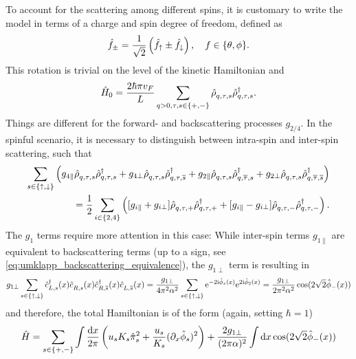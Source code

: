 To account for the scattering among different spins, it is customary to write the model in terms of a charge and spin degree of freedom, defined as
\begin{align}
    \hat f_\pm=\frac1{\sqrt2}\left( \hat f_\uparrow \pm \hat f_\downarrow \right),
    \quad
    f\in\{\theta,\phi\}.
\end{align}
This rotation is trivial on the level of the kinetic Hamiltonian and
\begin{align}
    \hat H_0 = \frac{2\hbar\pi v_F}L\sum_{q>0,\tau,s\in\{+,-\}}\hat\rho^\pdag_{q,\tau,s}\hat\rho^\dag_{q,\tau,s}.
\end{align}
Things are different for the forward- and backscattering processes $g_{2/4}$.
In the spinful scenario, it is necessary to distinguish between intra-spin and inter-spin scattering, such that
\begin{align}
  \sum_{s\in\{\uparrow,\downarrow\}}
  \brlr{
  g_{4\parallel}\hat\rho^\pdag_{q,\tau,s}\hat\rho^\dag_{q,\tau,s}
  +
  g_{4\perp}\hat\rho^\pdag_{q,\tau,s}\hat\rho^\dag_{q,\tau,\overline s}
  +
  g_{2\parallel}\hat\rho^\pdag_{q,\tau,s}\hat\rho^\dag_{q,\overline\tau,s}
  +
  g_{2\perp}\hat\rho^\pdag_{q,\tau,s}\hat\rho^\dag_{q,\overline\tau,\overline s}
  }
  \\
  =
  \frac12
  \sum_{i\in\{2,4\}}
  \brlr{
  [g_{i\parallel}+g_{i\perp}]\hat\rho^\pdag_{q,\tau,+}\hat\rho^\dag_{q,\tau,+}
  +
  [g_{i\parallel}-g_{i\perp}]\hat\rho^\pdag_{q,\tau,-}\hat\rho^\dag_{q,\tau,-}
  }.
\end{align}
The $g_1$ terms require more attention in this case:
While inter-spin terms $g_{1\parallel}$ are equivalent to backscattering terms (up to a sign, see \cref{eq:umklapp_backscattering_equivalence}), the $g_{1\perp}$ term is resulting in
\begin{align}
    g_{1\perp}\sum_{s\in\{\uparrow,\downarrow\}}\hat c^\dag_{L,s}(x)\hat c^\pdag_{R,s}(x)\hat c^\dag_{R,\overline s}(x)\hat c^\pdag_{L,\overline s}(x)
    =
    \frac{g_{1\perp}}{4\pi^2\alpha^2 }\sum_{s\in\{\uparrow,\downarrow\}}\re^{-2\ri\hat \phi_s(x)}\re^{2\ri\hat \phi_{\overline s}(x)}
    =
    \frac{g_{1\perp}}{2\pi^2\alpha^2}\cos(2\sqrt2\hat \phi_-(x))
\end{align}
and therefore, the total Hamiltonian is of the form (again, setting $\hbar=1$)
\begin{align}
    \hat H = \sum_{s\in\{+,-\}}\int\frac{\mathrm d x}{2\pi}\left( u_s K_s\hat\pi_s^2 + \frac{u_s}{K_s}(\partial_x\hat\phi_s)^2 \right)
    +
    \frac{2g_{1\perp}}{(2\pi\alpha)^2}\int\mathrm d x\cos(2\sqrt2\hat\phi_-(x))
    \label{eq:ll_hamiltonian_spin}
\end{align}
